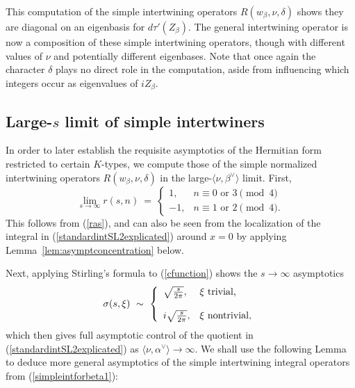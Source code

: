 \documentclass[12pt]{article}
\numberwithin{equation}{section}
\renewcommand\a{\alpha}
\renewcommand\b{\beta}
\renewcommand\d{\delta}
\renewcommand\({\left(}
\renewcommand\){\right)}
\begin{document}
This computation of the simple intertwining operators $R(w_\beta,\nu,\delta)$ shows they are diagonal on an eigenbasis for $d\tau'(Z_\beta)$.
The general intertwining operator is now a composition of these simple intertwining operators, though with different values of $\nu$ and  potentially different eigenbases.  Note that once again the character $\delta$ plays no direct role in the computation, aside from influencing which integers occur as  eigenvalues of $i Z_\beta$.  


\subsection{Large-$s$ limit of simple intertwiners}\label{sub:sec:largelimit}

In order to later establish the requisite asymptotics of the Hermitian form restricted to certain $K$-types,   we compute those of the simple normalized intertwining operators $R(w_\b,\nu,\d)$ in the large-$\langle \nu,\b^\vee\rangle$ limit.
First,
\begin{equation}\label{rasymptotics}
  \lim_{s\rightarrow\infty}r(s,n) \ = \ \left\{
                                          \begin{array}{ll}
                                            1, & n\equiv 0\text{~or~}3\pmod 4 \\
                                            -1, & n\equiv 1\text{~or~}2\pmod 4.
                                          \end{array}
                                        \right.
\end{equation}
This follows from (\ref{ras}), and can also be seen from the localization of the integral in (\ref{standardintSL2explicated}) around $x=0$ by applying Lemma~\ref{lem:asymptconcentration} below.

Next,  applying Stirling's formula to (\ref{cfunction}) shows the $s\rightarrow\infty$ asymptotics
\begin{equation}\label{sterling}
  \sigma(s,\xi) \  \sim  \ \left\{
                        \begin{array}{ll}
                        \sqrt{\frac{s}{2\pi}}, & \xi\hbox{ trivial,} \\
\\
                        i\sqrt{\frac{s}{2\pi}}, & \xi\hbox{ nontrivial,}
                        \end{array}
\right.
\end{equation}
which then gives full asymptotic control of the quotient in (\ref{standardintSL2explicated}) as $\langle \nu,\a^\vee\rangle\rightarrow\infty$.  We shall use the following Lemma to deduce  more general asymptotics of the simple intertwining integral operators from (\ref{simpleintforbeta1}):
\end{document}
